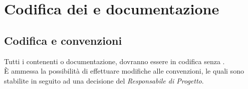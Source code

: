\section{Codifica dei  e documentazione}
  \subsection{Codifica e convenzioni}
  Tutti i  contenenti  o documentazione, dovranno essere in codifica  senza .\\
  È ammessa la possibilità di effettuare modifiche alle convenzioni, le quali sono stabilite in seguito ad una decisione del \emph{Responsabile di Progetto}.\\

\begin{comment}
  \subsection{Documentazione}
    I \glossaryItem{File} contenti \glossaryItem{Codice} dovranno essere provvisti di un'intestazione contenente:
    \begin{lstlisting}[frame=single]
      /*!
      * \file Nome del File
      * \author Autore (indirizzo e-mail dell'autore)
      * \date Data di creazione
      * \brief Breve descrizione del File
      *
      * Descrizione dettagliata del File
      */
    \end{lstlisting}
    Prima di ogni \glossaryItem{Classe} dovrà esserci un commento contenente:
    \begin{lstlisting}[frame=single]
      /*!
      * \class Nome della Classe
      * \brief Breve descrizione della Classe
      */
    \end{lstlisting}
    Prima di ogni \glossaryItem{Metodo} dovrà essere inserito un commento contenente:
    \begin{lstlisting}[frame=single]
      /*!
      * \brief Breve descrizione della funzione
      * \param Nome del primo parametro
      * \param Nome del secondo parametro
      * \return Valore ritornato dalla funzione
      */
    \end{lstlisting}
\end{comment}